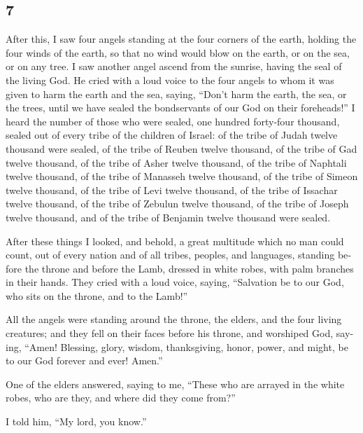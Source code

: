 \begin{paracol}{2}
\begin{otherlanguage}{english}
\hypertarget{section-13}{%
\section{7}\label{section-13}}

 After this, I saw four angels standing at the four
corners of the earth, holding the four winds of the earth, so that no
wind would blow on the earth, or on the sea, or on any tree.
 I saw another angel ascend from the sunrise, having the
seal of the living God. He cried with a loud voice to the four angels to
whom it was given to harm the earth and the sea,  saying,
``Don't harm the earth, the sea, or the trees, until we have sealed the
bondservants of our God on their foreheads!''  I heard the
number of those who were sealed, one hundred forty-four thousand, sealed
out of every tribe of the children of Israel:  of the
tribe of Judah twelve thousand were sealed, of the tribe of Reuben
twelve thousand, of the tribe of Gad twelve thousand,  of
the tribe of Asher twelve thousand, of the tribe of Naphtali twelve
thousand, of the tribe of Manasseh twelve thousand,  of
the tribe of Simeon twelve thousand, of the tribe of Levi twelve
thousand, of the tribe of Issachar twelve thousand,  of
the tribe of Zebulun twelve thousand, of the tribe of Joseph twelve
thousand, and of the tribe of Benjamin twelve thousand were sealed.

 After these things I looked, and behold, a great
multitude which no man could count, out of every nation and of all
tribes, peoples, and languages, standing before the throne and before
the Lamb, dressed in white robes, with palm branches in their hands.
 They cried with a loud voice, saying, ``Salvation be to
our God, who sits on the throne, and to the Lamb!''

 All the angels were standing around the throne, the
elders, and the four living creatures; and they fell on their faces
before his throne, and worshiped God,  saying, ``Amen!
Blessing, glory, wisdom, thanksgiving, honor, power, and might, be to
our God forever and ever! Amen.''

 One of the elders answered, saying to me, ``These who
are arrayed in the white robes, who are they, and where did they come
from?''

 I told him, ``My lord, you know.''


\end{otherlanguage}
\end{paracol}
